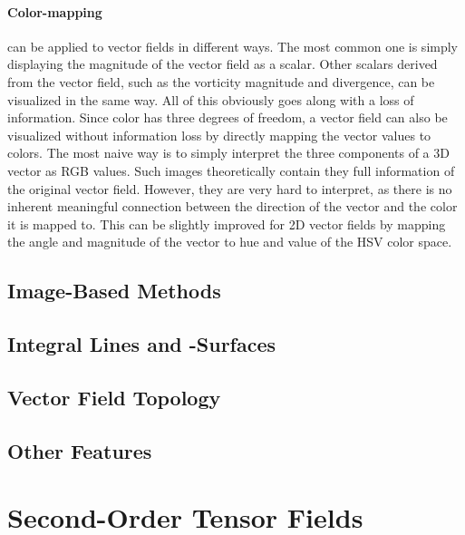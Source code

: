 \paragraph{Color-mapping} can be applied to vector fields in different ways.
%
The most common one is simply displaying the magnitude of the vector field as a
scalar.
%
Other scalars derived from the vector field, such as the vorticity magnitude and
divergence, can be visualized in the same way.
%
All of this obviously goes along with a loss of information.
%
Since color has three degrees of freedom, a vector field can also be visualized
without information loss by directly mapping the vector values to colors.
%
The most naive way is to simply interpret the three components of a \ac{3D}
vector as RGB values.
%
Such images theoretically contain they full information of the original vector
field.
%
However, they are very hard to interpret, as there is no inherent meaningful
connection between the direction of the vector and the color it is mapped to.
%
This can be slightly improved for \ac{2D} vector fields by mapping the angle
and magnitude of the vector to hue and value of the HSV color space.
%
%
\subsection{Image-Based Methods} %
\label{sub:image_based_methods}
%

%
\subsection{Integral Lines and -Surfaces} %
\label{sub:integral_lines_and_surfaces}

%
\subsection{Vector Field Topology} %
\label{sub:vector_field_topology}
%

%
\subsection{Other Features} %
\label{sub:other_features}
%

%
%
%
%
%
%

\section{Second-Order Tensor Fields} %
\label{sec:tensor_fields}


